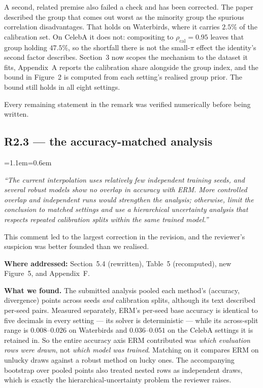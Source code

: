 \documentclass[11pt,a4paper]{article}
\newenvironment{reviewer}
  {\begin{list}{}{\leftmargin=1.1em\rightmargin=0.6em}\item[]\itshape\color{revgrey}\small}
  {\end{list}}
\newcommand{\where}[1]{{\textbf{Where addressed:} #1\par}}
\newcommand{\rpoint}[2]{\subsection*{#1 --- #2}}
\begin{document}
A second, related premise also failed a check and has been corrected. The paper described
the group that comes out worst as the minority group the spurious correlation disadvantages. That
holds on Waterbirds, where it carries $2.5\%$ of the calibration set. On CelebA it does not:
compositing to $\rho_{\mathrm{cal}}=0.95$ leaves that group holding $47.5\%$, so the shortfall there is not the
small-$\pi$ effect the identity's second factor describes. Section~3 now scopes the mechanism to
the dataset it fits, Appendix~A reports the calibration share alongside the group index, and the
bound in Figure~2 is computed from each setting's realised group prior. The
bound still holds in all eight settings.

Every remaining statement in the remark was verified numerically before being written.

\rpoint{R2.3}{the accuracy-matched analysis}

\begin{reviewer}
``The current interpolation uses relatively few independent training seeds, and several robust
models show no overlap in accuracy with ERM. More controlled overlap and independent runs would
strengthen the analysis; otherwise, limit the conclusion to matched settings and use a hierarchical
uncertainty analysis that respects repeated calibration splits within the same trained model.''
\end{reviewer}

This comment led to the largest correction in the revision, and the reviewer's suspicion was better
founded than we realised.

\where{Section~5.4 (rewritten), Table~5 (recomputed), new Figure~5, and Appendix~F.}

\textbf{What we found.} The submitted analysis pooled each method's (accuracy, divergence) points
across seeds \emph{and} calibration splits, although its text described per-seed pairs. Measured separately, ERM's per-seed base accuracy is
identical to five decimals in every setting --- its solver is deterministic --- while its across-split
range is $0.008$--$0.026$ on Waterbirds and $0.036$--$0.051$ on the CelebA settings it is retained in. So the entire accuracy axis ERM contributed was \emph{which evaluation rows
were drawn}, not \emph{which model was trained}. Matching on it compares ERM on unlucky draws
against a robust method on lucky ones. The accompanying bootstrap over pooled points also treated
nested rows as independent draws, which is exactly the hierarchical-uncertainty problem the reviewer
raises.
\end{document}

